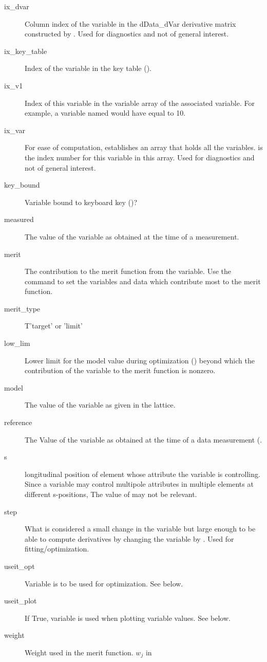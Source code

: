 \begin{description}
  \item[ix_dvar] \Newline
Column index of the variable in the dData_dVar derivative matrix constructed by \tao.
Used for diagnostics and not of general interest.
  \item[ix_key_table] \Newline
Index of the variable in the key table ().
  \item[ix_v1] \Newline
Index of this variable in the variable array of the associated  variable.
For example, a variable named  would have  equal to 10.
  \item[ix_var] \Newline
For ease of computation, \tao establishes an array that holds all the variables.
 is the index number for this variable in this array. 
Used for diagnostics and not of general interest.
  \item[key_bound] \Newline
Variable bound to keyboard key ()?
  \item[measured] \Newline
The value of the variable as obtained at the time of a  measurement.
  \item[merit] \Newline
The contribution to the merit function  from the variable. Use the 
command to set the variables and data which contribute most to the merit function.
  \item[merit_type] \Newline
T'target' or 'limit'
  \item[low_lim] \Newline
Lower limit for the model value during optimization () beyond which
the contribution of the variable to the merit function is nonzero.
  \item[model] \Newline
The value of the variable as given in the  lattice.
  \item[reference] \Newline
The Value of the variable as obtained at the time of a  data measurement
(.
  \item[s] \Newline
longitudinal position of element whose attribute the variable is controlling.  Since a
variable may control multipole attributes in multiple elements at different s-positions,
The value of  may not be relevant.
  \item[step] \Newline
What is considered a small change in the variable but large enough to be able to compute
derivatives by changing the variable by . Used for fitting/optimization.  
  \item[useit_opt] \Newline
Variable is to be used for optimization. See below.
  \item[useit_plot] \Newline
If True, variable is used when plotting variable values. See below.
  \item[weight] \Newline
Weight used in the merit function. $w_j$ in 
  \end{description}


